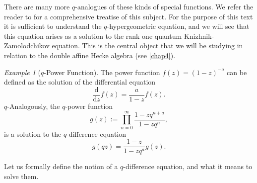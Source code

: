 \documentclass[a4paper]{report}
\theoremstyle{theorem}
\theoremstyle{definition}
\theoremstyle{remark}
\theoremstyle{proposition}
\theoremstyle{conjecture}
\theoremstyle{lemma}
\theoremstyle{corollary}
\theoremstyle{exercise}
\theoremstyle{example}
\newtheorem{example}{Example}
\begin{document}
  There are many more $q$-analogues of these kinds of special 
  functions. We refer the reader to \cite{am10} for a comprehensive treatise of 
  this subject.
  For the purpose of this text it is sufficient to understand the 
  $q$-hypergeometric equation, and we will see that this equation
  arises as a solution to the rank one quantum Knizhnik-Zamolodchikov equation.
  This  is the central object that we will be studying in relation to the
  double affine Hecke algebra (see \ref{chap4}).
  
  \begin{example}[$q$-Power Function]
      The power function $f(z) = (1-z)^{-a}$ can be defined as the solution
      of the differential equation
      $$\frac{\mathrm{d} }{\mathrm{d} z}f(z) = \frac{a}{1-z} f(z).$$
      $q$-Analogously, the $q$-power function 
      $$g(z) := \prod_{n=0}^\infty \frac{1-zq^{n+a}}{1-zq^n},$$
      is a solution to the $q$-difference equation $$g(qz) = \frac{1-z}{1-zq^a}g(z).$$
  \end{example}
  
  Let us formally define the notion of a $q$-difference equation, and what it 
  means to solve them.
  
\end{document}
